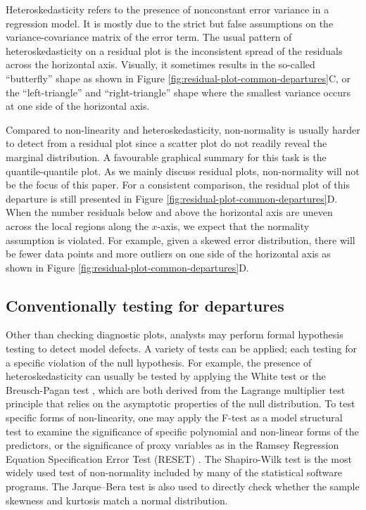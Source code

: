 \documentclass[]{interact}
\theoremstyle{plain}%
\theoremstyle{definition}
\theoremstyle{remark}
\begin{document}
Heteroskedasticity refers to the presence of nonconstant error variance
in a regression model. It is mostly due to the strict but false
assumptions on the variance-covariance matrix of the error term. The
usual pattern of heteroskedasticity on a residual plot is the
inconsistent spread of the residuals across the horizontal axis.
Visually, it sometimes results in the so-called ``butterfly'' shape as
shown in Figure \ref{fig:residual-plot-common-departures}C, or the
``left-triangle'' and ``right-triangle'' shape where the smallest
variance occurs at one side of the horizontal axis.

Compared to non-linearity and heteroskedasticity, non-normality is
usually harder to detect from a residual plot since a scatter plot do
not readily reveal the marginal distribution. A favourable graphical
summary for this task is the quantile-quantile plot. As we mainly
discuss residual plots, non-normality will not be the focus of this
paper. For a consistent comparison, the residual plot of this departure
is still presented in Figure \ref{fig:residual-plot-common-departures}D.
When the number residuals below and above the horizontal axis are uneven
across the local regions along the \(x\)-axis, we expect that the
normality assumption is violated. For example, given a skewed error
distribution, there will be fewer data points and more outliers on one
side of the horizontal axis as shown in Figure
\ref{fig:residual-plot-common-departures}D.

\hypertarget{conventionally-testing-for-departures}{%
\subsection{Conventionally testing for
departures}\label{conventionally-testing-for-departures}}

Other than checking diagnostic plots, analysts may perform formal
hypothesis testing to detect model defects. A variety of tests can be
applied; each testing for a specific violation of the null hypothesis.
For example, the presence of heteroskedasticity can usually be tested by
applying the White test \citep{white_heteroskedasticity-consistent_1980}
or the Breusch-Pagan test \citep{breusch_simple_1979}, which are both
derived from the Lagrange multiplier test \citep{silvey1959lagrangian}
principle that relies on the asymptotic properties of the null
distribution. To test specific forms of non-linearity, one may apply the
F-test as a model structural test to examine the significance of
specific polynomial and non-linear forms of the predictors, or the
significance of proxy variables as in the Ramsey Regression Equation
Specification Error Test (RESET) \citep{ramsey_tests_1969}. The
Shapiro-Wilk test \citep{shapiro1965analysis} is the most widely used
test of non-normality included by many of the statistical software
programs. The Jarque--Bera test \citep{jarque1980efficient} is also used
to directly check whether the sample skewness and kurtosis match a
normal distribution.
\end{document}
